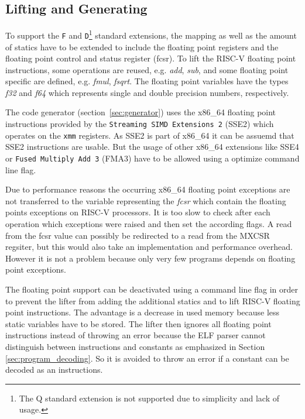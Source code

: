 \documentclass[course=eragp]{aspdoc}
\begin{document}
\subsection{Lifting and Generating}

To support the \texttt{F} and \texttt{D}\footnote{The Q standard extension is not supported due to simplicity and lack of usage.}
standard extensions, the mapping as well as the amount of statics have to be extended to include the
floating point registers and the floating point control and status register (fcsr). To lift the
RISC-V floating point instructions, some operations are reused, e.g. \emph{add}, \emph{sub}, and some floating
point specific are defined, e.g. \emph{fmul}, \emph{fsqrt}. The floating point variables have the
types \emph{f32} and \emph{f64} which represents single and double precision numbers, respectively.

\par

The code generator (section~\ref{sec:generator}) uses the x86\_64 floating point instructions
provided by the \texttt{Streaming SIMD Extensions 2} (SSE2) which operates on the \texttt{xmm}
registers. As SSE2 is part of x86\_64 it can be assuemd that SSE2 instructions are usable. But the
usage of other x86\_64 extensions like SSE4 or \texttt{Fused Multiply Add 3} (FMA3) have to
be allowed using a optimize command line flag.

\par

Due to performance reasons the occurring x86\_64 floating point exceptions are not transferred to
the variable representing the \emph{fcsr} which contain the floating points exceptions on RISC-V
processors. It is too slow to check after each operation which exceptions were raised and then set
the according flags. A read from the fcsr value can possibly be redirected to a read from the MXCSR
regsiter, but this would also take an implementation and performance overhead. However it is not a problem
because only very few programs depends on floating point exceptions.

\par

The floating point support can be deactivated using a command line flag in order to prevent the
lifter from adding the additional statics and to lift RISC-V floating point instructions. The
advantage is a decrease in used memory because less static variables have to be stored. The lifter
then ignores all floating point instructions instead of throwing an error because the ELF parser
cannot distinguish between instructions and constants as emphasized in Section
\ref{sec:program_decoding}. So it is avoided to throw an error if a constant can be decoded as an
instructions.
\end{document}
